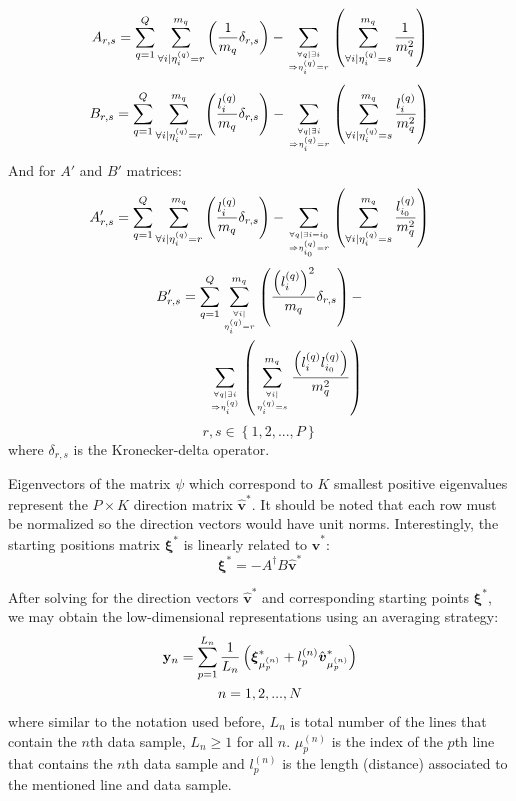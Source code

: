\documentclass[10pt,journal,cspaper,compsoc]{IEEEtran}
\begin{document}
\begin{align}
\label{eq14}
A_{r,s}=\sum_{q=1}^{Q}\sum_{\forall i|\eta_i^{(q)}=r}^{m_q}\left(\frac{1}{m_q}\delta_{r,s}\right)-\sum_{\forall q|\exists i \atop \Rightarrow \eta_i^{(q)}=r}\left(\sum_{\forall i|\eta_i^{(q)}=s}^{m_q}\frac{1}{m_q^2}\right)
\end{align}
\begin{align}
\label{eq15}
B_{r,s}=\sum_{q=1}^{Q}\sum_{\forall i|\eta_i^{(q)}=r}^{m_q}\left(\frac{l_i^{(q)}}{m_q}\delta_{r,s}\right)-\sum_{\forall q|\exists i \atop \Rightarrow \eta_i^{(q)}=r}\left(\sum_{\forall i|\eta_i^{(q)}=s}^{m_q}\frac{l_i^{(q)}}{m_q^2}\right)
\end{align}
And for $A'$ and $B'$ matrices:
\begin{align}
\label{eq16}
A'_{r,s}=\sum_{q=1}^{Q}\sum_{\forall i|\eta_i^{(q)}=r}^{m_q}\left(\frac{l_i^{(q)}}{m_q}\delta_{r,s}\right)-\sum_{\forall q|\exists i=i_0 \atop \Rightarrow \eta_{i_0}^{(q)}=r}\left(\sum_{\forall i|\eta_i^{(q)}=s}^{m_q}\frac{l_{i_0}^{(q)}}{m_q^2}\right)
\end{align}
\begin{align}
\label{eq17}
B'_{r,s}=\sum_{q=1}^{Q}\sum_{\forall i|\atop\eta_i^{(q)}=r}^{m_q}\left(\frac{\left(l_i^{(q)}\right)^2}{m_q}\delta_{r,s}\right)-\nonumber
\\
\sum_{\forall q|\exists i \atop \Rightarrow \eta_i^{(q)}}\left(\sum_{\forall i|\atop\eta_i^{(q)}=s}^{m_q}\frac{\left(l_i^{(q)}l_{i_0}^{(q)}\right)}{m_q^2}\right)
\end{align}
\begin{equation}
r,s\in\left\{1,2,...,P\right\} \nonumber
\end{equation}
where $\delta_{r,s}$ is the Kronecker-delta operator.

Eigenvectors of the matrix $\psi$ which correspond to $K$ smallest positive eigenvalues represent the $P\times K$ direction matrix $\hat{\boldsymbol{v}}^*$. It should be noted that each row must be normalized so the direction vectors would have unit norms. Interestingly, the starting positions matrix $\boldsymbol{\xi}^*$ is linearly related to $\hat{\boldsymbol{v}}^*$:
\begin{equation}
\label{eq18}
\boldsymbol{\xi}^*=-A^{\dagger}B\hat{\boldsymbol{v}}^*
\end{equation}

After solving for the direction vectors $\hat{\boldsymbol{v}}^*$ and corresponding starting points $\boldsymbol{\xi}^*$, we may obtain the low-dimensional representations using an averaging strategy:
\begin{gather}
\label{eq19}
{\bf y}_n=\sum_{p=1}^{L_n}\frac{1}{L_n}\left(\boldsymbol{\xi}^*_{\mu_p^{(n)}}+l_p^{(n)}\hat{\boldsymbol{v}}^*_{\mu_p^{(n)}}\right) \\
n=1,2,...,N \nonumber
\end{gather}
where similar to the notation used before, $L_n$ is total number of the lines that contain the $n$th data sample, $L_n\geq1$ for all $n$. $\mu_p^{(n)}$ is the index of the $p$th line that contains the $n$th data sample and $l_p^{(n)}$ is the length (distance) associated to the mentioned line and data sample.
\end{document}
